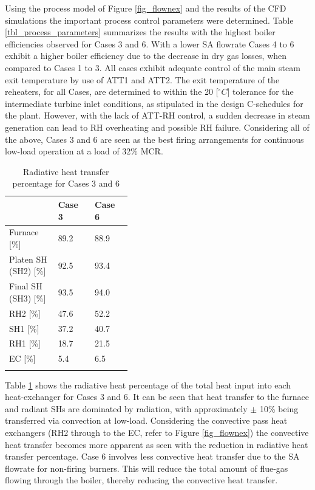 \documentclass[review]{elsarticle}
\begin{document}
Using the process model of Figure \ref{fig_flownex} and the results of the CFD simulations the important process control parameters were determined. Table \ref{tbl_process_parameters} summarizes the results with the highest boiler efficiencies observed for Cases 3 and 6. With a lower SA flowrate Cases 4 to 6 exhibit a higher boiler efficiency due to the decrease in dry gas losses, when compared to Cases 1 to 3. All cases exhibit adequate control of the main steam exit temperature by use of ATT1 and ATT2. The exit temperature of the reheaters, for all Cases, are determined to within the 20 [$^\circ C$] tolerance for the intermediate turbine inlet conditions, as stipulated in the design C-schedules for the plant. However, with the lack of ATT-RH control, a sudden decrease in steam generation can lead to RH overheating and possible RH failure. Considering all of the above, Cases 3 and 6 are seen as the best firing arrangements for continuous low-load operation at a load of 32\% MCR.

\begin{table}[h!]
\centering
\caption{Radiative heat transfer percentage for Cases 3 and 6}
\vspace{2mm}
{\tabulinesep=1.2mm
\begin{tabularx}{\linewidth}{p{0.4\linewidth} XX}
\hline
 &\textbf{Case 3}&\textbf{Case 6}\\
\hline
Furnace [\%] & 89.2 & 88.9\\
Platen SH (SH2) [\%] & 92.5& 93.4\\
Final SH (SH3) [\%] & 93.5& 94.0\\
RH2 [\%] & 47.6& 52.2\\
SH1 [\%] & 37.2& 40.7\\
RH1 [\%] & 18.7& 21.5\\
EC [\%] & 5.4& 6.5\\
\hline
\label{tbl_rad_conv}
\end{tabularx}}
\end{table}

Table \ref{tbl_rad_conv} shows the radiative heat percentage of the total heat input into each heat-exchanger for Cases 3 and 6. It can be seen that heat transfer to the furnace and radiant SHs are dominated by radiation, with approximately $\pm$ 10\% being transferred via convection at low-load. Considering the convective pass heat exchangers (RH2 through to the EC, refer to Figure \ref{fig_flownex}) the convective heat transfer becomes more apparent as seen with the reduction in radiative heat transfer percentage. Case 6 involves less convective heat transfer due to the SA flowrate for non-firing burners. This will reduce the total amount of flue-gas flowing through the boiler, thereby reducing the convective heat transfer.
\end{document}
